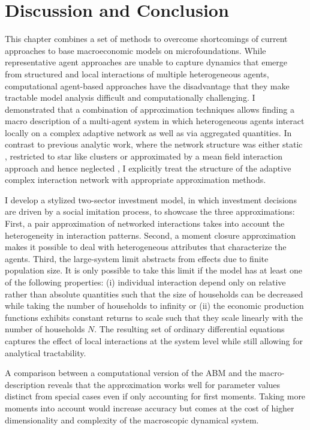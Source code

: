 \section{Discussion and Conclusion}
\label{sec:approx_conclusion}
This chapter combines a set of methods to overcome shortcomings of current approaches to base macroeconomic models on microfoundations.
While representative agent approaches are unable to capture dynamics that emerge from structured and local interactions of multiple heterogeneous agents, computational agent-based approaches have the disadvantage that they make tractable model analysis difficult and computationally challenging.
I demonstrated that a combination of approximation techniques allows finding a macro description of a multi-agent system in which heterogeneous agents interact locally on a complex adaptive network as well as via aggregated quantities. 
In contrast to previous analytic work, where the network structure was either static \cite{Lux2016}, restricted to star like clusters \cite{DiGuilmi2012} or approximated by a mean field interaction approach and hence neglected \cite{Aoki1998, Aoki2007, Alfarano2008a, DiGuilmi2008, Chiarella2011a}, I explicitly treat the structure of the adaptive complex interaction network with appropriate approximation methods.

I develop a stylized two-sector investment model, in which investment decisions are driven by a social imitation process, to showcase the three approximations:
First, a pair approximation of networked interactions takes into account the heterogeneity in interaction patterns.
Second, a moment closure approximation makes it possible to deal with heterogeneous attributes that characterize the agents.
Third, the large-system limit abstracts from effects due to finite population size.
It is only possible to take this limit if the model has at least one of the following properties: (i) individual interaction depend only on relative rather than absolute quantities such that the size of households can be decreased while taking the number of households to infinity or (ii) the economic production functions exhibits constant returns to scale such that they scale linearly with the number of households $N$.
The resulting set of ordinary differential equations captures the effect of local interactions at the system level while still allowing for analytical tractability.

A comparison between a computational version of the ABM and the macro-description reveals that the approximation works well for parameter values distinct from special cases even if only accounting for first moments. Taking more moments into account would increase accuracy but comes at the cost of higher dimensionality and complexity of the macroscopic dynamical system.

